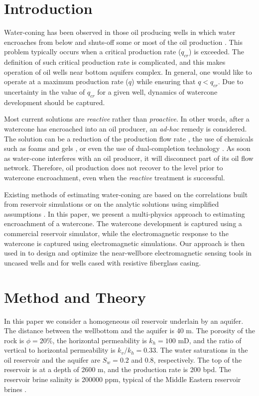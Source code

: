 \documentclass{eage19}
\begin{document}
\section{Introduction}
Water-coning has been observed in those oil producing wells in which water encroaches from below and shuts-off some or most of the oil production \citep{Muskat1934}. This problem typically occurs when a critical production rate ($q_{cr}$) is exceeded. The definition of such critical production rate is complicated, and this makes operation of oil wells near bottom aquifers complex. In general, one would like to operate at a maximum production rate ($q$) while ensuring that $q<q_{cr}$. Due to uncertainty in the value of $q_{cr}$ for a given well, dynamics of watercone development should be captured.

Most current solutions are \textit{reactive} rather than \textit{proactive}. In other words, after a watercone has encroached into an oil producer, an \textit{ad-hoc} remedy is considered. The solution can be a reduction of the production flow rate \citep{Larry2007}, the use of chemicals such as foams \citep{Persoff1990} and gels \citep{Seright1993}, or even the use of dual-completion technology \citep{Ould2004}. As soon as water-cone interferes with an oil producer, it will disconnect part of its oil flow network. Therefore, oil production does not recover to the level prior to watercone encroachment, even when the \textit{reactive} treatment is successful.

Existing methods of estimating water-coning are based on the correlations built from reservoir simulations \citep{Kuo1983} or on the analytic solutions using simplified assumptions \citep{Bournazel1971,Egbe2005}. In this paper, we present a multi-physics approach to estimating encroachment of a watercone. The watercone development is captured using a commercial reservoir simulator, while the electromagnetic response to the watercone is captured using electromagnetic simulations. Our approach is then used in to design and optimize the near-wellbore electromagnetic sensing tools in uncased wells and for wells cased with resistive fiberglass casing.

\section{Method and Theory}

In this paper we consider a homogeneous oil reservoir underlain by an aquifer. The distance between the wellbottom and the aquifer is 40 m. The porosity of the rock is $\phi =20$\%, the horizontal permeability is $k_h =100$ mD, and the ratio of vertical to horizontal permeability is $k_v/k_h=0.33$. The water saturations in the oil reservoir and the aquifer are $S_w =0.2$ and 0.8, respectively. The top of the reservoir is at a depth of 2600 m, and the production rate is 200 bpd. The reservoir brine salinity is 200000 ppm, typical of the Middle Eastern reservoir brines \citep{Staff1959}.
\end{document}
